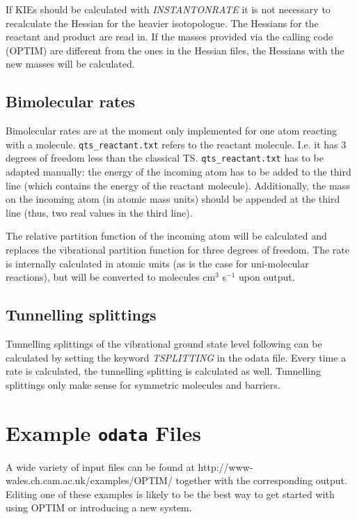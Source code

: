 \documentclass[12pt,a4paper,dvips]{article}
\begin{document}
If KIEs should be calculated with {\it INSTANTONRATE\/} it is
not necessary to recalculate the Hessian for the heavier isotopologue. The
Hessians for the reactant and product are read in. If the masses provided via
the calling code (OPTIM) are different from the ones in the
Hessian files, the Hessians with the new masses will be calculated.
\subsection{Bimolecular rates \label{sec:bimol}}

Bimolecular rates are at the moment only implemented for one atom reacting
with a molecule. \texttt{qts\_reactant.txt} refers to the reactant molecule. I.e. it
has 3 degrees of freedom less than the classical TS. \texttt{qts\_reactant.txt} has to
be adapted manually: the energy of the incoming atom has to be added to the
third line (which contains the energy of the reactant molecule). Additionally,
the mass on the incoming atom (in atomic mass units) should be appended at the
third line (thus, two real values in the third line).

The relative partition function of the incoming atom will be calculated and
replaces the vibrational partition function for three degrees of freedom. The
rate is internally calculated in atomic units (as is the case for uni-molecular
reactions), but will be converted to molecules cm$^3$ s$^{-1}$ upon output.

\subsection{Tunnelling splittings}

Tunnelling splittings of the vibrational ground state level following
\cite{ric11} can be calculated by setting the keyword {\it TSPLITTING\/} in the odata file. 
Every time a rate is calculated, the tunnelling splitting
is calculated as well. Tunnelling splittings only make sense for
symmetric molecules and barriers.




\section{Example {\tt odata} Files}
\label{sec:examples}
A wide variety of input files can be found at
http://www-wales.ch.cam.ac.uk/examples/OPTIM/
together with the corresponding output. Editing one of these examples is likely to
be the best way to get started with using OPTIM or introducing a new system.
\end{document}
